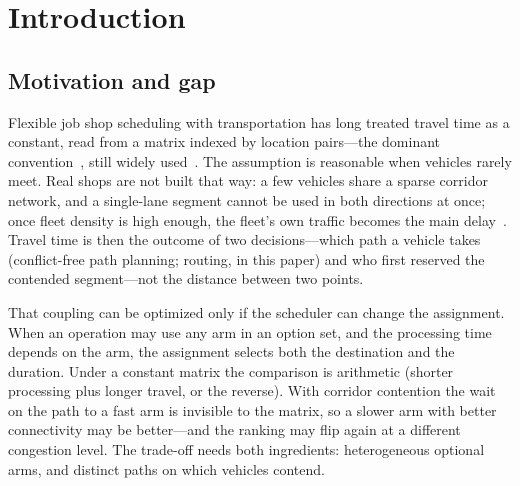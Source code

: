 \documentclass[manuscript,screen,review]{acmart}
\begin{document}

\maketitle
\section{Introduction}
\label{sec:Chapter_I}

\subsection{Motivation and gap}

Flexible job shop scheduling with transportation has long treated travel time as a constant, read from a matrix indexed by location pairs---the dominant convention~\cite{xin2025review}, still widely used~\cite{meng2025cp,qin2026knowledge,fu2025integrated}.
The assumption is reasonable when vehicles rarely meet.
Real shops are not built that way: a few vehicles share a sparse corridor network, and a single-lane segment cannot be used in both directions at once; once fleet density is high enough, the fleet's own traffic becomes the main delay~\cite{kim2026congestion}.
Travel time is then the outcome of two decisions---which path a vehicle takes (conflict-free path planning; routing, in this paper) and who first reserved the contended segment---not the distance between two points.

That coupling can be optimized only if the scheduler can change the assignment.
When an operation may use any arm in an option set, and the processing time depends on the arm, the assignment selects both the destination and the duration.
Under a constant matrix the comparison is arithmetic (shorter processing plus longer travel, or the reverse).
With corridor contention the wait on the path to a fast arm is invisible to the matrix, so a slower arm with better connectivity may be better---and the ranking may flip again at a different congestion level.
The trade-off needs both ingredients: heterogeneous optional arms, and distinct paths on which vehicles contend.
\end{document}
